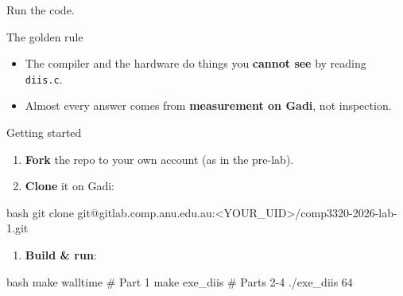 \documentclass[aspectratio=169]{beamer}
\begin{document}
\begin{frame}
  Run the code. 
\end{frame}

\begin{frame}{The golden rule}
  \begin{itemize}\setlength\itemsep{6pt}
    \item The compiler and the hardware do things you \textbf{cannot see} by
      reading \texttt{diis.c}.
    \item Almost every answer comes from \textbf{measurement on Gadi}, not
      inspection.
  \end{itemize}
\end{frame}

\begin{frame}[fragile]{Getting started}
  \begin{enumerate}\setlength\itemsep{4pt}
    \item \textbf{Fork} the repo to your own account (as in the pre-lab).
    \item \textbf{Clone} it on Gadi:
  \end{enumerate}
  \begin{cookiecode}[title={clone}]{bash}
git clone git@gitlab.comp.anu.edu.au:<YOUR_UID>/comp3320-2026-lab-1.git
  \end{cookiecode}
  \begin{enumerate}\setlength\itemsep{4pt}\setcounter{enumi}{2}
    \item \textbf{Build \& run}:
  \end{enumerate}
  \begin{cookiecode}[title={build}]{bash}
make walltime      # Part 1
make exe_diis      # Parts 2-4
./exe_diis 64
  \end{cookiecode}
\end{frame}

\end{document}
